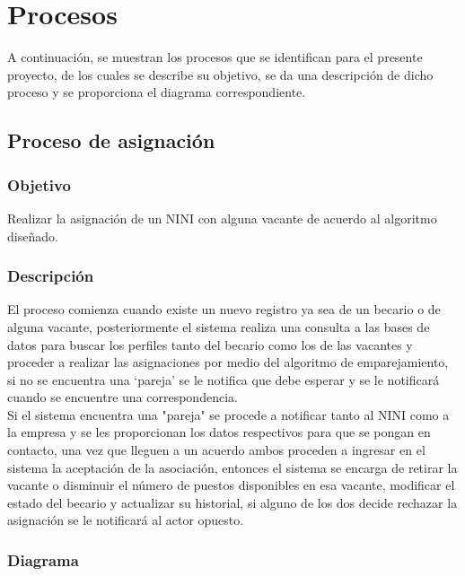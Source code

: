 \chapter{Procesos}

    A continuación, se muestran los procesos que se identifican para el presente proyecto, de los cuales se describe su objetivo, se da una descripción de dicho proceso y se proporciona el diagrama correspondiente.

    \section{Proceso de asignación}

        \subsection{Objetivo}

            Realizar la asignación de un NINI con alguna vacante de acuerdo al algoritmo diseñado.

        \subsection{Descripción}

            El proceso comienza cuando existe un nuevo registro ya sea de un becario o de alguna vacante, posteriormente el sistema realiza una consulta a las bases de datos para buscar los perfiles tanto del becario como los de las vacantes y proceder a realizar las asignaciones por medio del algoritmo de emparejamiento, si no se encuentra una `pareja' se le notifica que debe esperar y se le notificará cuando se encuentre una correspondencia.\\

            Si el sistema encuentra una "pareja" se procede a notificar tanto al NINI como a la empresa y se les proporcionan los datos respectivos para que se pongan en contacto, una vez que lleguen a un acuerdo ambos proceden a ingresar en el sistema  la aceptación de la asociación, entonces el sistema se encarga de retirar la vacante o disminuir el número de puestos disponibles en esa vacante, modificar el estado del becario y actualizar su historial, si alguno de los dos decide rechazar la asignación se le notificará al actor opuesto.

        \pagebreak
        \subsection{Diagrama}

